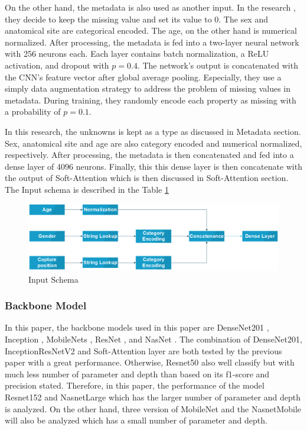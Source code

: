 \documentclass[sensors,article,submit,pdftex,moreauthors]{Definitions/mdpi}
\begin{document}
On the other hand, the metadata is also used as another input. In the research \cite{03910}, they decide to keep the missing value and set its value to $0$. The sex and anatomical site are categorical encoded. The age, on the other hand is numerical normalized. After processing, the metadata is fed into a two-layer neural network with 256 neurons each. Each layer contains batch normalization, a ReLU \cite{08375} activation, and dropout with $p = 0.4$. The network’s output is concatenated with the CNN’s feature vector after global average pooling. Especially, they use a simply data augmentation strategy to address the problem of missing values in metadata. During training, they randomly encode each property as missing with a probability of $p = 0.1$. 

In this research, the unknowns is kept as a type as discussed in Metadata section. Sex, anatomical site and age are also category encoded and numerical normalized, respectively. After processing, the metadata is then concatenated and fed into a dense layer of 4096 neurons. Finally, this this dense layer is then concatenate with the output of Soft-Attention which is then discussed in Soft-Attention section. The Input schema is described in the Table \ref{fig:input-schema}

\begin{figure}[H]
	\centering
	\includegraphics[width=1\linewidth]{"Definitions/Input Schema"}
	\caption{Input Schema}
	\label{fig:input-schema}
\end{figure}

\subsubsection{Backbone Model}
In this paper, the backbone models used in this paper are DenseNet201 \cite{06993}, Inception \cite{00567}, MobileNets \cite{04861} \cite{04381} \cite{02244}, ResNet \cite{03385} \cite{05027}, and NasNet \cite{07012}. The combination of DenseNet201, InceptionResNetV2 and Soft-Attention layer are both tested by the previous paper \cite{03358} with a great performance. Otherwise, Resnet50 also well classify but with much less number of parameter and depth than based on its f1-score and precision stated. Therefore, in this paper, the performance of the model Resnet152 and NasnetLarge which has the larger number of parameter and depth is analyzed. On the other hand, three version of MobileNet and the NasnetMobile will also be analyzed which has a small number of parameter and depth. 
\end{document}
